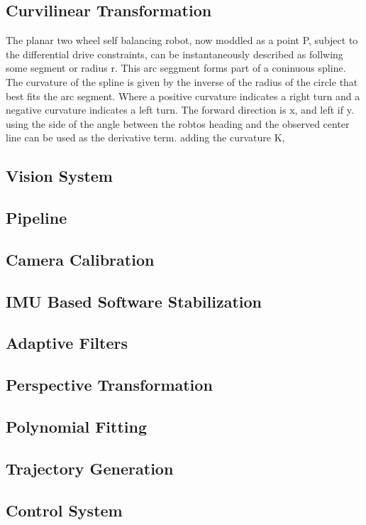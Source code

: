         \subsection{Curvilinear Transformation}
            The planar two wheel self balancing robot, now moddled as a point P, subject to the differential drive constraints, 
            can be instantaneously described as follwing some segment or radius r. This arc seggment forms part of a coninuous spline. 
            The curvature of the spline is given by the inverse of the radius of the circle that best fits the arc segment.
            Where a positive curvature indicates a right turn and a negative curvature indicates a left turn.
            The forward direction is x, and left if y. using the side of the angle between the robtos heading and the observed center line can be used as the derivative term.
            adding the curvature K, 
        \subsection{Vision System}
            \subsection{Pipeline}
            \subsection{Camera Calibration}
            \subsection{IMU Based Software Stabilization}
            \subsection{Adaptive Filters}
            \subsection{Perspective Transformation}
            \subsection{Polynomial Fitting}
        \subsection{Trajectory Generation}
        \subsection{Control System}
